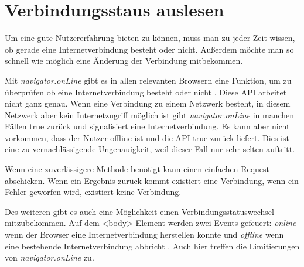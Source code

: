 \section{Verbindungsstaus auslesen}
Um eine gute Nutzererfahrung bieten zu können, muss man zu jeder Zeit wissen, ob gerade eine Internetverbindung besteht oder nicht. Außerdem möchte man so schnell wie möglich eine Änderung der Verbindung mitbekommen.

Mit \emph{navigator.onLine} gibt es in allen relevanten Browsern \autocite{caniuse-online} eine Funktion, um zu überprüfen ob eine Internetverbindung besteht oder nicht \autocite{Sheppard2017} \autocite{mdn-online}. Diese \ac{API} arbeitet nicht ganz genau. Wenn eine Verbindung zu einem Netzwerk besteht, in diesem Netzwerk aber kein Internetzugriff möglich ist gibt \emph{navigator.onLine} in manchen Fällen true zurück und signalisiert eine Internetverbindung\autocite{Sheppard2017}. Es kann aber nicht vorkommen, dass der Nutzer offline ist und die \ac{API} true zurück liefert. Dies ist eine zu vernachlässigende Ungenauigkeit, weil dieser Fall nur sehr selten auftritt. 

Wenn eine zuverlässigere Methode benötigt kann einen einfachen Request abschicken. Wenn ein Ergebnis zurück kommt existiert eine Verbindung, wenn ein Fehler geworfen wird, existiert keine Verbindung. 

Des weiteren gibt es auch eine Möglichkeit einen Verbindungsstatuswechsel mitzubekommen. Auf dem <body> Element werden zwei Events gefeuert: \emph{online} wenn der Browser eine Internetverbindung herstellen konnte und \emph{offline} wenn eine bestehende Internetverbindung abbricht \autocite{mdn-online}. Auch hier treffen die Limitierungen von \emph{navigator.onLine} zu.
